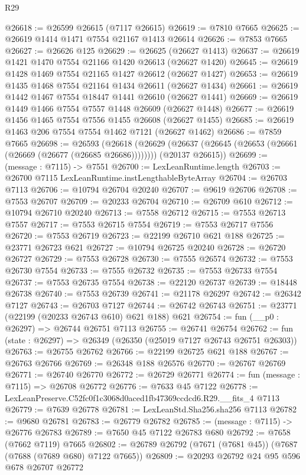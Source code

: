 \begin{lexlean}{R29}
\begin{coremodule}
@26618 := @26599 @26615 (@7117 @26615)
@26619 := @7810 @7665
@26625 := @26619 @1414 @1471 @7554 @21167 @1413 @26614
@26626 := @7853 @7665
@26627 := @26626 @125
@26629 := @26625 (@26627 @1413)
@26637 := @26619 @1421 @1470 @7554 @21166 @1420 @26613 (@26627 @1420)
@26645 := @26619 @1428 @1469 @7554 @21165 @1427 @26612 (@26627 @1427)
@26653 := @26619 @1435 @1468 @7554 @21164 @1434 @26611 (@26627 @1434)
@26661 := @26619 @1442 @1467 @7554 @18447 @1441 @26610 (@26627 @1441)
@26669 := @26619 @1449 @1466 @7554 @7557 @1448 @26609 (@26627 @1448)
@26677 := @26619 @1456 @1465 @7554 @7556 @1455 @26608 (@26627 @1455)
@26685 := @26619 @1463 @206 @7554 @7554 @1462 @7121 (@26627 @1462)
@26686 := @7859 @7665
@26698 := @26593
    (@26618
      (@26629 (@26637 (@26645 (@26653 (@26661 (@26669 (@26677 (@26685 @26686))))))))
      (@20137 @26615))
@26699 := (message : @7115) -> @7551
@26700 := LexLeanRuntime.length
@26703 := @26700 @7115 LexLeanRuntime.instLengthableByteArray
@26704 := @26703 @7113
@26706 := @10794 @26704 @20240
@26707 := @9619 @26706
@26708 := @7553 @26707
@26709 := @20233 @26704
@26710 := @26709 @610
@26712 := @10794 @26710 @20240
@26713 := @7558 @26712
@26715 := @7553 @26713 @7557
@26717 := @7553 @26715 @7554
@26719 := @7553 @26717 @7556
@26720 := @7553 @26719
@26723 := @22199 @26710 @621 @188
@26725 := @23771 @26723 @621
@26727 := @10794 @26725 @20240
@26728 := @26720 @26727
@26729 := @7553 @26728
@26730 := @7555 @26574
@26732 := @7553 @26730 @7554
@26733 := @7555 @26732
@26735 := @7553 @26733 @7554
@26737 := @7553 @26735 @7554
@26738 := @22120 @26737
@26739 := @18448 @26738
@26740 := @7553 @26739
@26741 := @21178 @26297
@26742 := @26342 @7127
@26743 := @26703 @7127
@26744 := @26742 @26743
@26751 := @23771 (@22199 (@20233 @26743 @610) @621 @188) @621
@26754 := fun (__p0 : @26297) => @26744 @26751 @7113
@26755 := @26741 @26754
@26762 := fun (state : @26297) => @26349 (@26350 (@25019 @7127 @26743 @26751 @26303))
@26763 := @26755 @26762
@26766 := @22199 @26725 @621 @188
@26767 := @26763 @26766
@26769 := @26348 @188 @26576
@26770 := @26767 @26769
@26771 := @26740 @26770
@26772 := @26729 @26771
@26774 := fun (message : @7115) => @26708 @26772
@26776 := @7633 @45 @7122
@26778 := LexLeanPreserve.C52fc0f1c3068d0aced1fb47369ccdcd6.R29.__fits_4 @7113
@26779 := @7639 @26778
@26781 := LexLeanStd.Sha256.sha256 @7113
@26782 := @9680 @26781
@26783 := @26779 @26782
@26785 := (message : @7115) -> @26776 @26783
@26789 := @7650 @45 @7122 @26783 @680
@26792 := @7658 (@7662 @7119) @7665
@26802 := @26789 @26792 (@7671 (@7681 @45)) (@7687 (@7688 (@7689 @680) @7122 @7665))
@26809 := @20293 @26792 @24 @95 @596 @678 @26707 @26772

\end{coremodule}
\end{lexlean}
